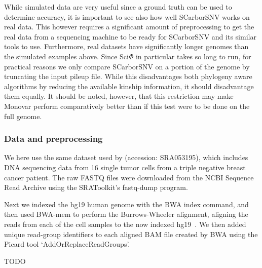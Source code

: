 \documentclass[../../main.tex]{subfiles}
\begin{document}
While simulated data are very useful since a ground truth can be used to determine accuracy, it is important to see also how well SCarborSNV works on real data.
This however requires a significant amount of preprocessing to get the real data from a sequencing machine to be ready for SCarborSNV and its similar tools to use.
Furthermore, real datasets have significantly longer genomes than the simulated examples above.
Since Sci$\Phi$ in particular takes so long to run, for practical reasons we only compare SCarborSNV on a portion of the genome by truncating the input pileup file.
While this disadvantages both phylogeny aware algorithms by reducing the available kinship information, it should disadvantage them equally.
It should be noted, however, that this restriction may make Monovar perform comparatively better than if this test were to be done on the full genome.

\subsubsection*{Data and preprocessing}
We here use the same dataset used by \cite{sciphi} (accession: SRA053195), which includes DNA sequencing data from 16 single tumor cells from a triple negative breast cancer patient.
The raw FASTQ files were downloaded from the NCBI Sequence Read Archive using the SRAToolkit's fastq-dump program.

Next we indexed the hg19 human genome with the BWA index command, and then used BWA-mem to perform the Burrows-Wheeler alignment, aligning the reads from each of the cell samples to the now indexed hg19~\cite{BWAMEM}.
We then added unique read-group identifiers to each aligned BAM file created by BWA using the Picard tool `AddOrReplaceReadGroups'.

\large{TODO}
\end{document}
